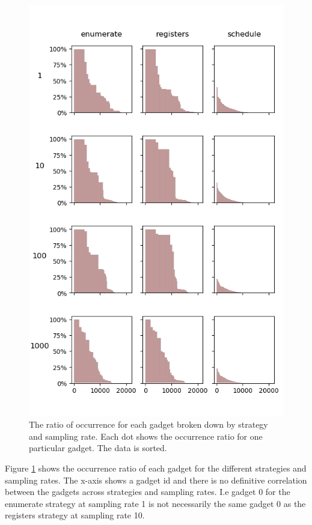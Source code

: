 \begin{figure}[htp]
	\centering
	\includegraphics[width=\textwidth,height=\textheight]{results/figures/gadgets}
	\caption{The ratio of occurrence for each gadget broken down by strategy and sampling rate.
Each dot shows the occurrence ratio for one particular gadget. The data is sorted.}
	\label{fig:gadgets}
\end{figure}

Figure \ref{fig:gadgets} shows the occurrence ratio of each gadget for the different
strategies and sampling rates. The x-axis shows a gadget id and there is no definitive
correlation between the gadgets across strategies and sampling rates. I.e gadget 0 for the
enumerate strategy at sampling rate 1 is not necessarily the same gadget 0 as the registers
strategy at sampling rate 10.

